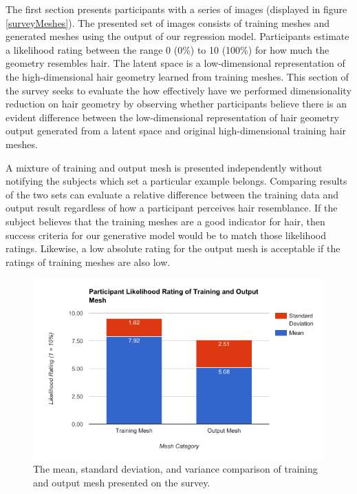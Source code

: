 \documentclass[ %
author={Dillon Keith Diep},
supervisor={Dr. Carl Henrik Ek},
degree={MEng},
title={ART-CG Hair:},
subtitle={Assisted Real-time Content Generation of Stylised Virtual Hair},
type={Research},
year={2017} ]{dissertation}
\begin{document}
The first section presents participants with a series of images (displayed in figure \ref{surveyMeshes}). The presented set of images consists of training meshes and generated meshes using the output of our regression model. Participants estimate a likelihood rating between the range 0 (0\%) to 10 (100\%) for how much the geometry resembles hair. 
The latent space is a low-dimensional representation of the high-dimensional hair geometry learned from training meshes. This section of the survey seeks to evaluate the how effectively have we performed dimensionality reduction on hair geometry by observing whether participants believe there is an evident difference between the low-dimensional representation of hair geometry output generated from a latent space and original high-dimensional training hair meshes. 

A mixture of training and output mesh is presented independently without notifying the subjects which set a particular example belongs. Comparing results of the two sets can evaluate a relative difference between the training data and output result regardless of how a participant perceives hair resemblance. If the subject believes that the training meshes are a good indicator for hair, then success criteria for our generative model would be to match those likelihood ratings. Likewise, a low absolute rating for the output mesh is acceptable if the ratings of training meshes are also low.

\begin{figure}[!h]
	\centering
	\includegraphics[scale=0.6]{images/meshRating}
	\caption{The mean, standard deviation, and variance comparison of training and output mesh presented on the survey.}
\end{figure}
\end{document}
